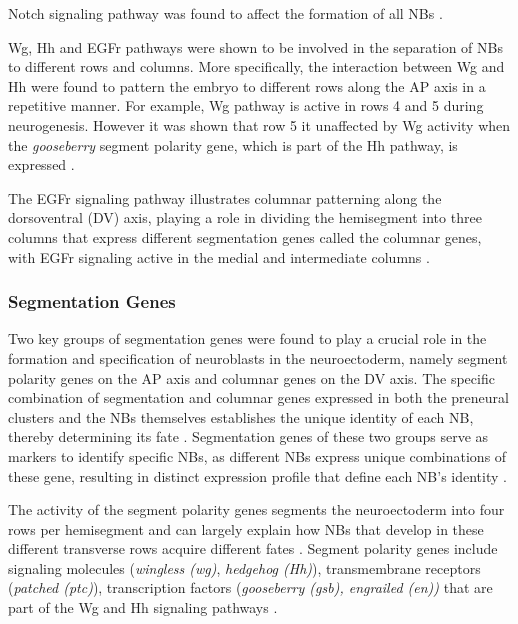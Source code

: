 Notch signaling pathway was found to affect the formation of all NBs \cite{Crews2019}. 

Wg, Hh and EGFr pathways were shown to be involved in the separation of NBs to different rows and columns. 
More specifically, the interaction between Wg and Hh were found to pattern the embryo to different rows
along the AP axis in a repetitive manner. %
For example, Wg pathway is active  in rows 4 and 5 during neurogenesis. However it was shown that 
row 5 it unaffected by Wg activity when the \textit{gooseberry} segment polarity gene, which is part of the Hh pathway, 
is expressed \cite{mcdonald1997establishing, Bhat1999}. 

The EGFr signaling pathway illustrates columnar patterning along the dorsoventral (DV) axis, playing a role in dividing 
the hemisegment into three columns that express different segmentation genes called the columnar genes, with EGFr signaling 
active in the medial and intermediate columns \cite{Skeath2003}. 

\subsubsection{Segmentation Genes}
Two key groups of segmentation genes were found to play a crucial role in the formation and specification of neuroblasts 
in the neuroectoderm, namely segment polarity genes on the AP axis and columnar genes on the DV axis. 
The specific combination of segmentation and columnar genes expressed in both the preneural clusters and the NBs themselves 
establishes the unique identity of each NB, thereby determining its fate \cite{Bhat1999, Skeath1999}. 
Segmentation genes of these two groups serve as markers to identify specific NBs, as different NBs express unique combinations 
of these gene, resulting in distinct expression profile that define each NB's identity \cite{doe1992molecular}. 

The activity of the segment polarity genes segments the neuroectoderm into four rows per hemisegment and can largely 
explain how NBs that develop in these different transverse rows acquire different fates \cite{Bhat1999, Skeath1999}.  
Segment polarity genes include signaling molecules (\textit{wingless (wg)}, \textit{hedgehog (Hh)}), 
transmembrane receptors (\textit{patched (ptc)}), transcription factors (\textit{gooseberry (gsb), engrailed (en))} 
that are part of the Wg and Hh signaling pathways \cite{Bhat1999}.  


